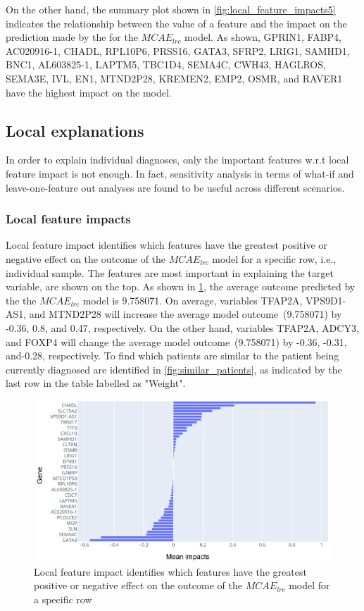 \hspace*{3.5mm} On the other hand, the summary plot shown in \cref{fig:local_feature_impacts5} indicates the relationship between the value of a feature and the impact on the prediction made by the for the $MCAE_{lrc}$ model. As shown, GPRIN1, FABP4, AC020916-1, CHADL, RPL10P6, PRSS16, GATA3, SFRP2, LRIG1, SAMHD1, BNC1, AL603825-1, LAPTM5, TBC1D4, SEMA4C, CWH43, HAGLROS, SEMA3E, IVL, EN1, MTND2P28, KREMEN2, EMP2, OSMR, and RAVER1 have the highest impact on the model. 

\subsection{Local explanations}
In order to explain individual diagnoses, only the important features w.r.t local feature impact is not enough. In fact, sensitivity analysis in terms of what-if and leave-one-feature out analyses are found to be useful across different scenarios. 

\subsubsection{Local feature impacts}
Local feature impact identifies which features have the greatest positive or negative effect on the outcome of the $MCAE_{lrc}$ model for a specific row, i.e., individual sample. The features are most important in explaining the target variable, are shown on the top. As shown in \cref{fig:local_feature_impacts}, the average outcome predicted by the the $MCAE_{lrc}$ model is 9.758071. On average, variables TFAP2A, VPS9D1-AS1, and MTND2P28 will increase the average model outcome~(9.758071) by -0.36, 0.8, and 0.47, respectively. On the other hand, variables TFAP2A, ADCY3, and FOXP4 will change the average model outcome~(9.758071) by -0.36, -0.31, and-0.28, respectively. To find which patients are similar to the patient being currently diagnosed are identified in \cref{fig:similar_patients}, as indicated by the last row in the table labelled as "Weight". 

\begin{figure}[h]
    \centering
	\includegraphics[scale=1.2]{images/local_fi_1.png}
	\caption{Local feature impact identifies which features have the greatest positive or negative effect on the outcome of the $MCAE_{lrc}$ model for a specific row}
    \label{fig:local_feature_impacts}
\end{figure}


